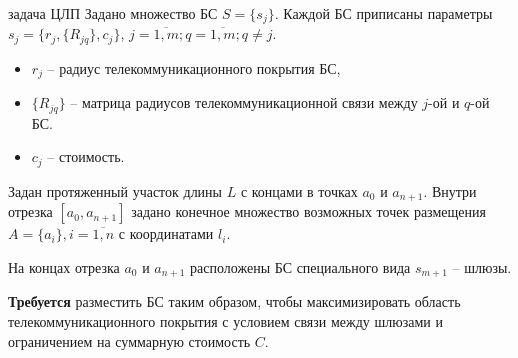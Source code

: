 
\begin{frame}
    {задача ЦЛП}
    \justifying
    Задано множество БС $S = \{s_j\}$. Каждой БС приписаны параметры $s_j = \{r_j, \{R_{jq}\}, c_j \}$, $j = \overline{1,m}; q = \overline{1,m}; q \neq j$. 
    \begin{itemize}
        \item $r_j$ -- радиус телекоммуникационного покрытия БС,
        \item $\{R_{jq} \}$ -- матрица радиусов телекоммуникационной связи между $j$-ой и $q$-ой БС.
        \item $c_j$ -- стоимость.
    \end{itemize} 
    
    \medskip

    Задан протяженный участок длины $L$ с концами в точках $a_0$ и $a_{n+1}$. Внутри  отрезка $[a_0, a_{n+1}]$ задано конечное множество возможных точек размещения $A=\{a_i\}, i=\overline{1,n}$ с координатами $l_i$.

    
    \medskip
    На концах отрезка $a_0$ и $a_{n+1}$ расположены БС специального вида $s_{m+1}$ -- шлюзы.
    \bigskip

    \textbf{Требуется} разместить  БС таким образом, чтобы максимизировать область телекоммуникационного покрытия с условием связи между шлюзами и ограничением на суммарную стоимость $C$.
    

\end{frame}



